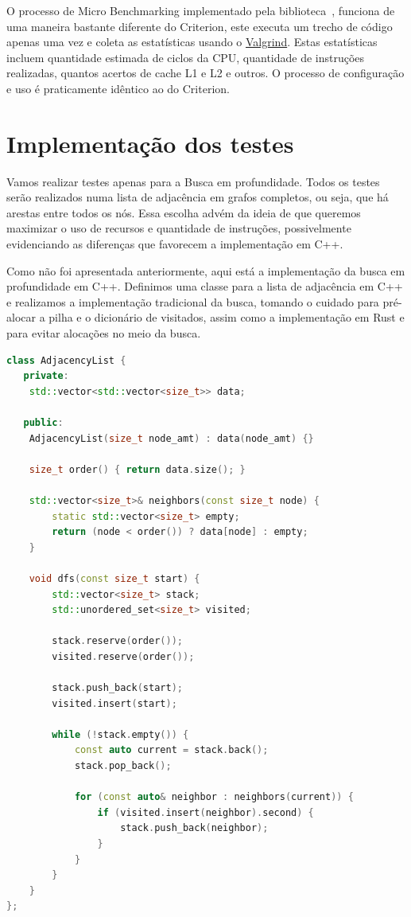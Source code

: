O processo de Micro Benchmarking implementado pela
biblioteca~\cite{gungraunrust}, funciona de uma maneira bastante
diferente do Criterion, este executa um trecho de código apenas uma
vez e coleta as estatísticas usando o
\href{https://valgrind.org/}{Valgrind}. Estas estatísticas incluem
quantidade estimada de ciclos da CPU, quantidade de instruções
realizadas, quantos acertos de cache L1 e L2 e outros. O processo de
configuração e uso é praticamente idêntico ao do Criterion.

\section{Implementação dos testes}

Vamos realizar testes apenas para a Busca em
profundidade. Todos os testes serão realizados numa lista de
adjacência em grafos completos, ou seja, que há arestas entre todos
os nós. Essa escolha advém da ideia de que queremos maximizar o uso
de recursos e quantidade de instruções, possivelmente evidenciando
as diferenças que favorecem a implementação em C++.

Como não foi apresentada anteriormente, aqui está a implementação da
busca em profundidade em C++. Definimos uma classe para a lista de
adjacência em C++ e realizamos a implementação tradicional da busca,
tomando o cuidado para pré-alocar a pilha e o dicionário de
visitados, assim como a implementação em Rust e para evitar alocações
no meio da busca.

\begin{lstlisting}[language=C++, caption={Implementação da busca em profundidade em C++}]
class AdjacencyList {
   private:
    std::vector<std::vector<size_t>> data;

   public:
    AdjacencyList(size_t node_amt) : data(node_amt) {}

    size_t order() { return data.size(); }

    std::vector<size_t>& neighbors(const size_t node) {
        static std::vector<size_t> empty;
        return (node < order()) ? data[node] : empty;
    }

    void dfs(const size_t start) {
        std::vector<size_t> stack;
        std::unordered_set<size_t> visited;

        stack.reserve(order());
        visited.reserve(order());

        stack.push_back(start);
        visited.insert(start);

        while (!stack.empty()) {
            const auto current = stack.back();
            stack.pop_back();

            for (const auto& neighbor : neighbors(current)) {
                if (visited.insert(neighbor).second) {
                    stack.push_back(neighbor);
                }
            }
        }
    }
};
\end{lstlisting}

